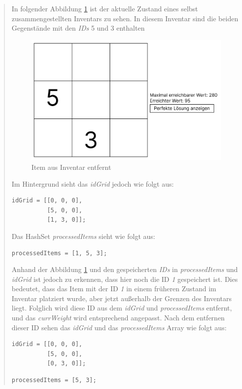 \begin{quote}
In folgender Abbildung \ref{fig:controller_itemEntfernt} ist der aktuelle Zustand eines selbst zusammengestellten Inventars
zu sehen. In diesem Inventar sind die beiden Gegenstände mit den \textit{IDs} 5 und 3 enthalten

\begin{figure}[H]
    \centering
    \includegraphics[scale=0.6]{images/itemEntfernt}
    \caption{Item aus Inventar entfernt}
    \label{fig:controller_itemEntfernt}
\end{figure}
Im Hintergrund sieht das \textit{idGrid} jedoch wie folgt aus:

\begin{lstlisting}[style=csharp label=code:controller_savedIDitemEntferntGrid]
idGrid = [[0, 0, 0],
          [5, 0, 0],
          [1, 3, 0]];
\end{lstlisting}

Das HashSet \textit{processedItems} sieht wie folgt aus:

\begin{lstlisting}[style=csharp label=code:controller_savedIDItemEntferntHash]
processedItems = [1, 5, 3];
\end{lstlisting}

Anhand der Abbildung \ref{fig:controller_itemEntfernt} und den gespeicherten \textit{IDs} in \textit{processedItems} und
\textit{idGrid} ist jedoch zu erkennen, dass hier noch die ID \textit{1} gespeichert ist. Dies bedeutet, dass das Item
mit der ID \textit{1} in einem früheren Zustand im Inventar platziert wurde, aber jetzt außerhalb der Grenzen des Inventars
liegt. Folglich wird diese ID aus dem \textit{idGrid} und \textit{processedItems} entfernt, und das \textit{currWeight}
wird entsprechend angepasst. Nach dem entfernen dieser ID sehen das \textit{idGrid} und das \textit{processedItems} Array
wie folgt aus:

\begin{lstlisting}[style=csharp label=code:controller_savedIDgg]
idGrid = [[0, 0, 0],
          [5, 0, 0],
          [0, 3, 0]];
\end{lstlisting}
\begin{lstlisting}[style=csharp label=code:controller_savedIDID]
processedItems = [5, 3];
\end{lstlisting}
\end{quote}


